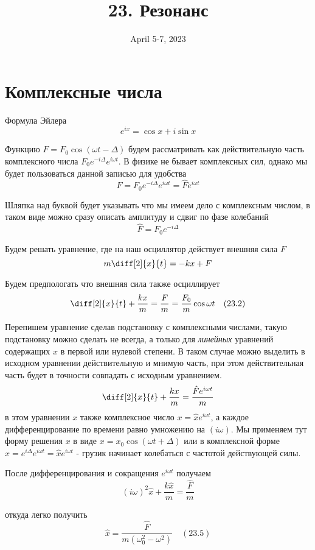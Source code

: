 \documentclass[12pt]{article}
\date{April 5-7, 2023}
\title{23. Резонанс}
\begin{document}
\maketitle

\section{Комплексные числа}

Формула Эйлера
\[
    e^{ix}=\cos x+i\sin x
\]

Функцию $F=F_0 \cos(\omega t-\Delta)$ будем рассматривать как действительную часть комплексного числа $F_0 e^{-i \Delta} e^{i \omega t}$. В физике не бывает комплексных сил, однако мы будет пользоваться данной записью для удобства
\[
    F=F_0 e^{-i \Delta} e^{i \omega t} = \hat{F} e^{i \omega t}
\]

Шляпка над буквой будет указывать что мы имеем дело с комплексным числом, в таком виде можно сразу описать амплитуду и сдвиг по фазе колебаний
\[
    \hat{F}=F_0 e^{-i \Delta}
\]

Будем решать уравнение, где на наш осциллятор действует внешняя сила $F$
\[
    m\diff[2]{x}{t}=-kx + F
\]

Будем предпологать что внешняя сила также осциллирует
\[
    \diff[2]{x}{t}+\frac{kx}{m}=\frac{F}{m}=\frac{F_0}{m} \cos\omega t \quad (23.2)
\]


Перепишем уравнение сделав подстановку с комплексными числами, такую подстановку можно сделать не всегда, а только для \textit{линейных} уравнений содержащих $x$ в первой или нулевой степени. В таком случае можно выделить в исходном уравнении действительную и мнимую часть, при этом действительная часть будет в точности совпадать с исходным уравнением.
\[
    \diff[2]{x}{t}+\frac{kx}{m}=\frac{\hat{F} e^{i \omega t}}{m}
\]
в этом уравнении $x$ также комплексное число $x=\hat{x} e^{i \omega t}$, а каждое дифференцирование по времени равно умножению на $(i \omega)$. Мы применяем тут форму решения $x$ в виде $x=x_0\cos(\omega t+\Delta)$ или в комплексной форме $x=e^{i \Delta} e^{i \omega t} = \hat{x} e^{i \omega t}$ - грузик начинает колебаться с частотой действующей силы.

После дифференцирования и сокращения $e^{i \omega t}$ получаем
\[
    (i \omega)^2 \hat{x} + \frac{k\hat{x}}{m} = \frac{\hat{F}}{m}
\]

откуда легко получить
\[
    \hat{x} = \frac{\hat{F}}{m(\omega_0^2-\omega^2)} \quad (23.5)
\]
\end{document}
